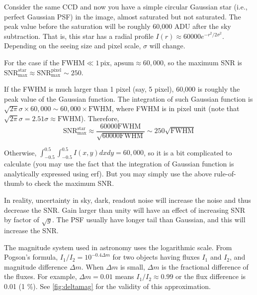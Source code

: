 \begin{ex}
Consider the same CCD and now you have a simple circular Gaussian star (i.e., perfect Gaussian PSF) in the image, almost saturated but not saturated. The peak value before the saturation will be roughly 60,000 ADU after the sky subtraction. That is, this star has a radial profile $ I(r) \approx 60000 e^{-r^2/2\sigma^2} $. Depending on the seeing size and pixel scale, $ \sigma $ will change. 

For the case if the $ \mathrm{FWHM} \ll 1 \,\mathrm{pix} $, $ \mathrm{apsum} \approx 60,000 $, so the maximum SNR is $ \mathrm{SNR}_\mathrm{max}^\mathrm{star} \approx \mathrm{SNR}_\mathrm{max}^\mathrm{pixel} \sim 250 $.
 
If the FWHM is much larger than 1 pixel (say, 5 pixel), 60,000 is roughly the peak value of the Gaussian function. The integration of such Gaussian function is $ \sqrt{2 \pi} \sigma \times 60,000 \sim 60,000 \times \mathrm{FWHM} $, where FWHM is in pixel unit (note that $ \sqrt{2\pi}\sigma = 2.51 \sigma \approx \mathrm{FWHM} $). Therefore, 
\begin{equation}
 \mathrm{SNR}_\mathrm{max}^\mathrm{star} 
 \approx \frac{60000 \mathrm{FWHM}}{\sqrt{60000 \mathrm{FWHM}}}
 \sim 250 \sqrt{\mathrm{FWHM}}
\end{equation}

Otherwise, $ \int_{-0.5}^{0.5}\int_{-0.5}^{0.5} I(x, y) dx dy = 60,000 $, so it is a bit complicated to calculate (you may use the fact that the integration of Gaussian function is analytically expressed using erf). But you may simply use the above rule-of-thumb to check the maximum SNR.

In reality, uncertainty in sky, dark, readout noise will increase the noise and thus decrease the SNR. Gain larger than unity will have an effect of increasing SNR by factor of $ \sqrt{g} $. The PSF usually have longer tail than Gaussian, and this will increase the SNR.
\end{ex}

The magnitude system used in astronomy uses the logarithmic scale. From Pogson's formula, $ I_1/I_2 = 10^{-0.4 \Delta m} $ for two objects having fluxes $ I_1 $ and $ I_2 $, and magnitude difference $ \Delta m $. When $ \Delta m $ is small, $ \Delta m $ is the fractional difference of the fluxes. For example, $ \Delta m = 0.01 $ means $ I_1/I_2 \approx 0.99 $ or the flux difference is 0.01 (1 \%). See \cref{fig:deltamag} for the validity of this approximation. 


